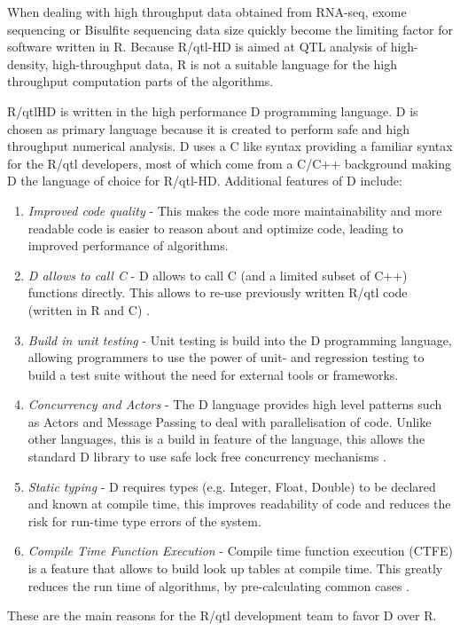 When dealing with high throughput data obtained from RNA-seq, exome sequencing or Bisulfite 
sequencing data size quickly become the limiting factor for software written in R. Because 
R/qtl-HD is aimed at QTL analysis of high-density, high-throughput data, R is not a suitable 
language for the high throughput computation parts of the algorithms.

R/qtlHD is written in the high performance D programming language. D is chosen as primary 
language because it is created to perform safe and high throughput numerical analysis. D uses 
a C like syntax \cite{Alexandrescu:2011} providing a familiar syntax for the R/qtl developers, 
most of which come from a C/C++ background making D the language of choice for R/qtl-HD. 
Additional features of D include:
\begin{enumerate}\itemsep1pt
\item \emph{Improved code quality} - This makes the code more maintainability and more readable code is 
easier to reason about and optimize code, leading to improved performance of algorithms.
\item \emph{D allows to call C} - D allows to call C (and a limited subset of C++) functions directly. This 
allows to re-use previously written R/qtl code (written in R and C) \cite{RQTLGuide:2009}.
\item \emph{Build in unit testing} - Unit testing is build into the D programming language, allowing 
programmers to use the power of unit- and regression testing to build a test suite without the need 
for external tools or frameworks.
\item \emph{Concurrency and Actors} - The D language provides high level patterns such as Actors and 
Message Passing to deal with parallelisation of code. Unlike other languages, this is a build in 
feature of the language, this allows the standard D library to use safe lock free concurrency mechanisms \cite{Alexandrescu:2011}.
\item \emph{Static typing} - D requires types (e.g. Integer, Float, Double) to be declared and known 
at compile time, this improves readability of code and reduces the risk for run-time type errors of the system.
\item \emph{Compile Time Function Execution} - Compile time function execution (CTFE) is a feature 
that allows to build look up tables at compile time. This greatly reduces the run time of algorithms, 
by pre-calculating common cases \cite{ArendsBlog:2012}.
\end{enumerate}
These are the main reasons for the R/qtl development team to favor D over R.

